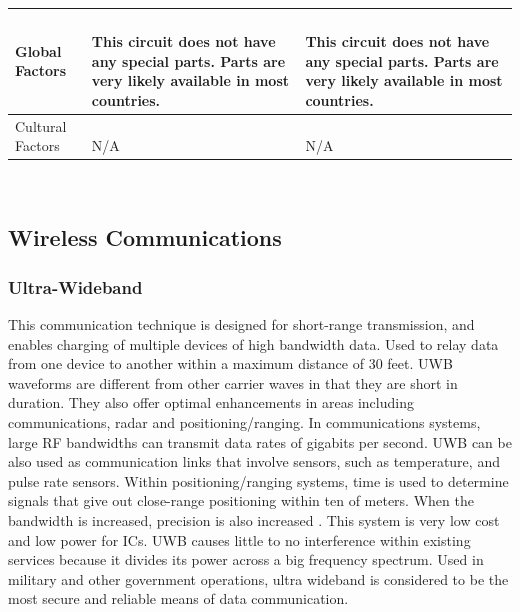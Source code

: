\documentclass[12pt]{article}
\begin{document}
\begin{table}[h!]
\begin{tabular}{| l | l | l |}
\parbox{0.17\linewidth}{\raggedleft Global Factors} & 
\parbox{0.240\linewidth}{\hfill \\
This circuit does not have any special parts. Parts are very likely available in most countries.
\\} & \parbox{0.240\linewidth}{\hfill \\
This circuit does not have any special parts. Parts are very likely available in most countries.
\\}\\ \hline
\parbox{0.17\linewidth}{\raggedleft Cultural Factors} & 
\parbox{0.240\linewidth}{\hfill \\
N/A
\\} & \parbox{0.240\linewidth}{\hfill \\
N/A
\\}\\ \hline
\end{tabular}
\end{table}
\hfill \\
\pagebreak

\subsection{Wireless Communications}
\subsubsection{Ultra-Wideband}
This communication technique is designed for short-range transmission, and enables charging of multiple devices of high bandwidth data. Used to relay data from one device to another within a maximum distance of 30 feet. UWB waveforms are different from other carrier waves in that they are short in duration. They also offer optimal enhancements in areas including communications, radar and positioning/ranging. In communications systems, large RF bandwidths can transmit data rates of gigabits per second. UWB can be also used as communication links that involve sensors, such as temperature, and pulse rate sensors. Within positioning/ranging systems, time is used to determine signals that give out close-range positioning within ten of meters. When the bandwidth is increased, precision is also increased \cite{ieeeuwb}. This system is very low cost and low power for ICs. UWB causes little to no interference within existing services because it divides its power across a big frequency spectrum. Used in military and other government operations, ultra wideband is considered to be the most secure and reliable means of data communication. \cite{widebandreg}\\
\end{document}
